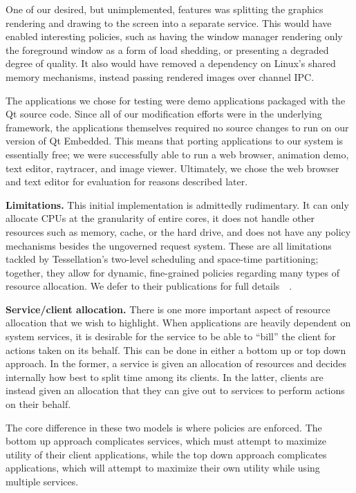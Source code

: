 \documentclass[letterpaper,twocolumn,11pt]{article}
\begin{document}
One of our desired, but unimplemented, features was splitting the graphics rendering and drawing to the screen into a separate service. This would have enabled interesting policies, such as having the window manager rendering only the foreground window as a form of load shedding, or presenting a degraded degree of quality. It also would have removed a dependency on Linux's shared memory mechanisms, instead passing rendered images over channel IPC.

The applications we chose for testing were demo applications packaged with the Qt source code. Since all of our modification efforts were in the underlying framework, the applications themselves required no source changes to run on our version of Qt Embedded. This means that porting applications to our system is essentially free; we were successfully able to run a web browser, animation demo, text editor, raytracer, and image viewer. Ultimately, we chose the web browser and text editor for evaluation for reasons described later.

\textbf{Limitations.} This initial implementation is admittedly rudimentary. It can only allocate CPUs at the granularity of entire cores, it does not handle other resources such as memory, cache, or the hard drive, and does not have any policy mechanisms besides the ungoverned request system. These are all limitations tackled by Tessellation's two-level scheduling and space-time partitioning; together, they allow for dynamic, fine-grained policies regarding many types of resource allocation. We defer to their publications for full details~\cite{liu09tessellation}~\cite{tessellation-hotpar10}.

\textbf{Service/client allocation.} There is one more important aspect of resource allocation that we wish to highlight. When applications are heavily dependent on system services, it is desirable for the service to be able to ``bill'' the client for actions taken on its behalf. This can be done in either a bottom up or top down approach. In the former, a service is given an allocation of resources and decides internally how best to split time among its clients. In the latter, clients are instead given an allocation that they can give out to services to perform actions on their behalf.

The core difference in these two models is where policies are enforced. The bottom up approach complicates services, which must attempt to maximize utility of their client applications, while the top down approach complicates applications, which will attempt to maximize their own utility while using multiple services.
\end{document}
